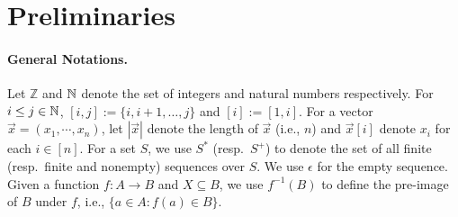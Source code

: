 
\section{Preliminaries}
\label{sec:prelim}

\paragraph{General Notations.}
Let $\mathbb{Z}$ and $\mathbb{N}$ denote the set of integers and natural numbers
respectively. For $i \le j \in \mathbb{N}$, $[i, j]:=\{i,i+1,\ldots,j\}$ and
$[i] := [1, i]$. 
For a vector
$\vec{x}=(x_1,\cdots, x_n)$, let $|\vec{x}|$ denote the length of $\vec{x}$
(i.e., $n$) and  $\vec{x}[i]$ denote $x_i$ for each $i \in [n]$. For a set
$S$, we use $S^*$ (resp.~$S^+$) to denote the set of all finite (resp.~finite
and nonempty) sequences over $S$. We use $\epsilon$ for the empty sequence.
Given a function $f: A \to B$ and $X \subseteq B$, we use $f^{-1}(B)$ to
define the pre-image of $B$ under $f$, i.e., $\{ a \in A: f(a) \in B \}$.


